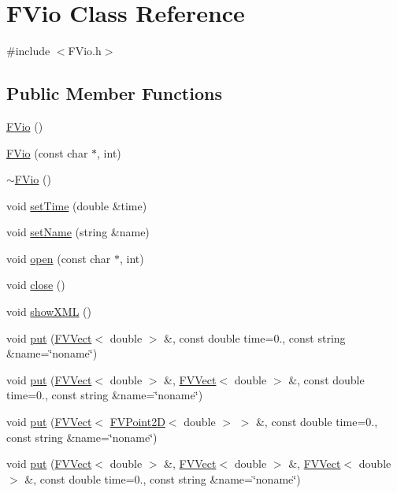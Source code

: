\hypertarget{classFVio}{
\section{FVio Class Reference}
\label{d7/db0/classFVio}
}


{\ttfamily \#include $<$FVio.h$>$}

\subsection*{Public Member Functions}
\begin{DoxyCompactItemize}
\item 
\hyperlink{classFVio_a75c2241187bfbff380a16dc4ed70291f}{FVio} ()
\item 
\hyperlink{classFVio_a298dab4ec69e2b91ab8265a7c858e8bd}{FVio} (const char $\ast$, int)
\item 
\hyperlink{classFVio_aecc86a5d324a69c6126ebd68bb31fec4}{$\sim$FVio} ()
\item 
void \hyperlink{classFVio_a235e1f96a630a20a5981f6d17ab0319c}{setTime} (double \&time)
\item 
void \hyperlink{classFVio_a998b61f865e5d91eaef9fa8d45d33079}{setName} (string \&name)
\item 
void \hyperlink{classFVio_af6230782e51214fb5a69d5096a6b5ceb}{open} (const char $\ast$, int)
\item 
void \hyperlink{classFVio_a5ae591df94fc66ccb85cbb6565368bca}{close} ()
\item 
void \hyperlink{classFVio_abac703505f4c85bc370b0065815ed9d2}{showXML} ()
\item 
void \hyperlink{classFVio_a0b966272d5799adb3c3d44f2070dcb54}{put} (\hyperlink{classFVVect}{FVVect}$<$ double $>$ \&, const double time=0., const string \&name=\char`\"{}noname\char`\"{})
\item 
void \hyperlink{classFVio_a2de97d8092f23cb404d41592059ced02}{put} (\hyperlink{classFVVect}{FVVect}$<$ double $>$ \&, \hyperlink{classFVVect}{FVVect}$<$ double $>$ \&, const double time=0., const string \&name=\char`\"{}noname\char`\"{})
\item 
void \hyperlink{classFVio_aa41152658dd545018330e60ab45360a1}{put} (\hyperlink{classFVVect}{FVVect}$<$ \hyperlink{classFVPoint2D}{FVPoint2D}$<$ double $>$ $>$ \&, const double time=0., const string \&name=\char`\"{}noname\char`\"{})
\item 
void \hyperlink{classFVio_ae2be5cff2b05b8c932d26dea37761b9d}{put} (\hyperlink{classFVVect}{FVVect}$<$ double $>$ \&, \hyperlink{classFVVect}{FVVect}$<$ double $>$ \&, \hyperlink{classFVVect}{FVVect}$<$ double $>$ \&, const double time=0., const string \&name=\char`\"{}noname\char`\"{})

\end{DoxyCompactItemize}
